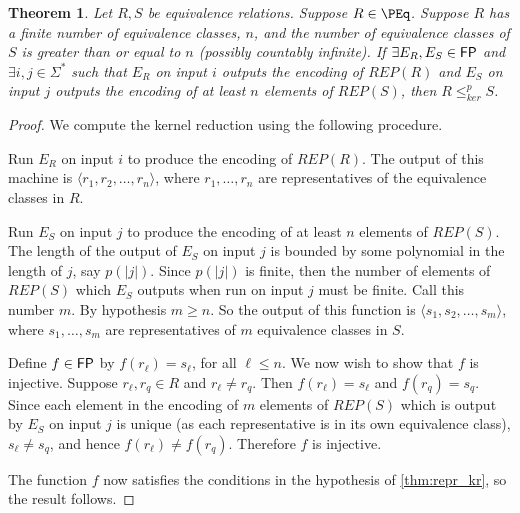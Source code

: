 \documentclass{article}
\newtheorem{theorem}{Theorem}[section]
\theoremstyle{definition} \newtheorem{definition}[definition]{Definition}
\newcommand{\sigmastar}{\Sigma^{*}} %
\newcommand{\kr}{\leq^{p}_{ker}} %
\begin{document}
\begin{theorem}\label{thm:reps}
  Let $R,S$ be equivalence relations. Suppose $R\in\PEq$. Suppose $R$ has a
  finite number of equivalence classes, $n$, and the number of equivalence
  classes of $S$ is greater than or equal to $n$ (possibly countably
  infinite). If $\exists E_R,E_S\in{\ensuremath{\mathsf{FP}}}$ and $\exists i,j\in\sigmastar$ such
  that $E_R$ on input $i$ outputs the encoding of $REP(R)$ and $E_S$ on input
  $j$ outputs the encoding of at least $n$ elements of $REP(S)$, then $R\kr S$.
\end{theorem}
\begin{proof}
  We compute the kernel reduction using the following procedure.

  Run $E_R$ on input $i$ to produce the encoding of $REP(R)$. The output of
  this machine is $\langle r_1, r_2, \ldots, r_n\rangle$, where $r_1,\dots,r_n$
  are representatives of the equivalence classes in $R$.

  Run $E_S$ on input $j$ to produce the encoding of at least $n$ elements of
  $REP(S)$. The length of the output of $E_S$ on input $j$ is bounded by some
  polynomial in the length of $j$, say $p(|j|)$. Since $p(|j|)$ is finite, then
  the number of elements of $REP(S)$ which $E_S$ outputs when run on input $j$
  must be finite. Call this number $m$. By hypothesis $m\geq n$. So the output
  of this function is $\langle s_1, s_2, \ldots, s_m\rangle$, where
  $s_1,\ldots, s_m$ are representatives of $m$ equivalence classes in $S$.

  Define $f\in{\ensuremath{\mathsf{FP}}}$ by $f(r_\ell)=s_\ell$, for all $\ell\leq n$. We now wish to
  show that $f$ is injective. Suppose $r_\ell,r_q\in R$ and $r_\ell\neq
  r_q$. Then $f(r_\ell)=s_\ell$ and $f(r_q)=s_q$. Since each element in the
  encoding of $m$ elements of $REP(S)$ which is output by $E_S$ on input $j$ is
  unique (as each representative is in its own equivalence class), $s_\ell\neq
  s_q$, and hence $f(r_\ell)\neq f(r_q)$. Therefore $f$ is injective.

  The function $f$ now satisfies the conditions in the hypothesis of
  \autoref{thm:repr_kr}, so the result follows.
\end{proof}


\end{document}
